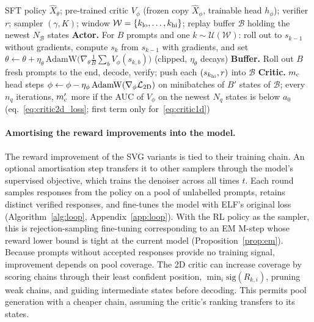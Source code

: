 \begin{algorithm}[t]
\caption{\method{} with a critic, (\ref{eq:critic1d}) or (\ref{eq:critic2d}); symbols in Appendix~\ref{app:details}}
\label{alg:jpc}
\small
\begin{algorithmic}[1]
\REQUIRE SFT policy $\hat X_\theta$; pre-trained critic $V_\phi$ (frozen copy $\hat X_\phi$, trainable head $h_\phi$); verifier $r$; sampler $(\gamma,K)$; window $\mathcal W=\{k_{\rm lo},\dots,k_{\rm hi}\}$; replay buffer $\mathcal B$ holding the newest $N_{\mathcal B}$ states
  \STATE \textbf{Actor.} For $B$ prompts and one $k\sim\mathcal U(\mathcal W)$: roll out to $s_{k-1}$ without gradients, compute $s_k$ from $s_{k-1}$ with gradients, and set $\theta\leftarrow\theta+\eta_\theta\,\mathrm{AdamW}\big(\nabla_\theta\frac1B\sum_{b}V_\phi(s_{k,b})\big)$ (clipped, $\eta_\theta$ decays) 
  \STATE \textbf{Buffer.} Roll out $B$ fresh prompts to the end, decode, verify; push each $(s_{k_{\rm hi}},r)$ into $\mathcal B$
  \STATE \textbf{Critic.} $m_{\rm c}$ head steps $\phi\leftarrow\phi-\eta_\phi\,\mathrm{AdamW}(\nabla_\phi\mathcal L_{\rm 2D})$ on minibatches of $B'$ states of $\mathcal B$; every $n_q$ iterations, $m'_{\rm c}$ more if the AUC of $V_\phi$ on the newest $N_q$ states is below $a_0$ \hfill (eq.~\ref{eq:critic2d_loss}; first term only for~\ref{eq:critic1d})
\ENDFOR
\end{algorithmic}
\end{algorithm}

\paragraph{Amortising the reward improvements into the model.}
\label{sec:loop}
The reward improvement of the SVG variants is tied to their training chain. An optional amortisation step transfers it to other samplers through the model's supervised objective, which trains the denoiser across all times $t$. Each round samples responses from the policy on a pool of unlabelled prompts, retains distinct verified responses, and fine-tunes the model with ELF's original loss (Algorithm~\ref{alg:loop}, Appendix~\ref{app:loop}). With the RL policy as the sampler, this is rejection-sampling fine-tuning \citep{yuan2023rft} corresponding to an EM M-step whose reward lower bound is tight at the current model (Proposition~\ref{prop:em}). Because prompts without accepted responses provide no training signal, improvement depends on pool coverage. The 2D critic can increase coverage by scoring chains through their least confident position, $\min_{i}\mathrm{sig}(R_{k,i})$, pruning weak chains, and guiding intermediate states before decoding. This permits pool generation with a cheaper chain, assuming the critic's ranking transfers to its states.
